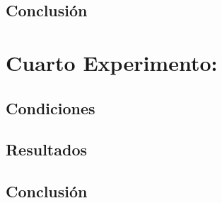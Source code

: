 \documentclass{article}
\theoremstyle{definition}
\theoremstyle{remark}
\begin{document}
\subsection{Conclusión}

\newpage

\section{Cuarto Experimento: }

\subsection{Condiciones}

\subsection{Resultados}

\subsection{Conclusión}
\end{document}
